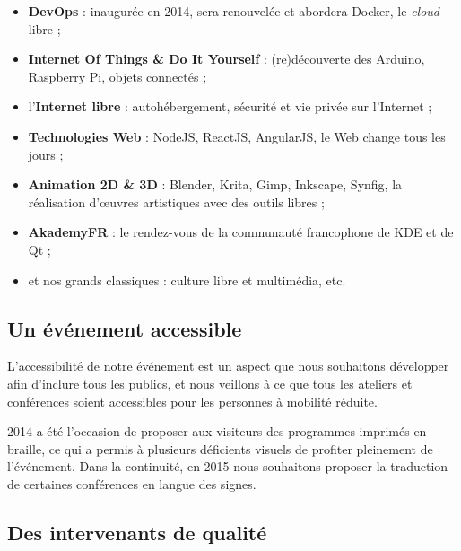 \begin{itemize}[label=$\bullet$]
\item \textbf{DevOps} : inaugurée en 2014, sera renouvelée et abordera Docker, le \textit{cloud} libre ;
\item \textbf{Internet Of Things \& Do It Yourself} : (re)découverte des Arduino, Raspberry Pi, objets connectés ;
\item l’\textbf{Internet libre} : autohébergement, sécurité et vie privée sur l’Internet ;
\item \textbf{Technologies Web} : NodeJS, ReactJS, AngularJS, le Web change tous les jours ;
\item \textbf{Animation 2D \& 3D} : Blender, Krita, Gimp, Inkscape, Synfig, la réalisation d'œuvres artistiques avec des outils libres ;

\item \textbf{AkademyFR} : le rendez-vous de la communauté francophone de KDE et de Qt ;
\item et nos grands classiques : culture libre et multimédia, etc.
\end{itemize}

\subsection{Un événement accessible}

\begin{minipage}{0.4\textwidth}
\begin{center}
\end{center}
\end{minipage}
\begin{minipage}{0.6\textwidth}
L'accessibilité de notre événement est un aspect que nous souhaitons
 développer afin d'inclure tous les publics, et nous veillons à ce que
 tous les ateliers et conférences soient accessibles pour les personnes
 à mobilité réduite.

2014 a été l'occasion de proposer aux visiteurs des programmes
 imprimés en braille, ce qui a permis à plusieurs déficients visuels
 de profiter pleinement de l'événement. Dans la continuité, en 2015
 nous souhaitons proposer la traduction de certaines conférences en
 langue des signes.
\end{minipage}

\subsection{Des intervenants de qualité}

